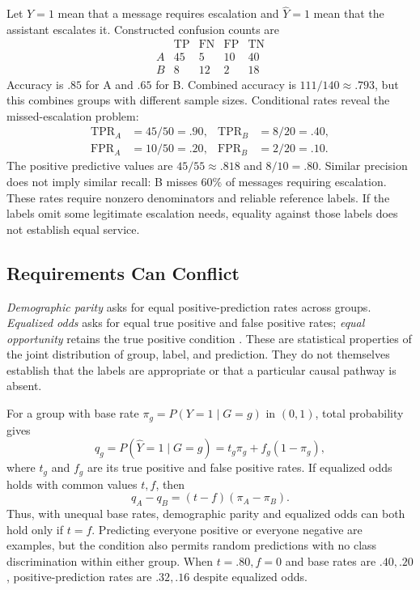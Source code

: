 Let $Y=1$ mean that a message requires escalation and $\hat Y=1$ mean that the assistant escalates it. Constructed confusion counts are
\[
\begin{array}{c|rrrr}
 &\mathrm{TP}&\mathrm{FN}&\mathrm{FP}&\mathrm{TN}\\\hline
A&45&5&10&40\\
B&8&12&2&18
\end{array}
\]
Accuracy is $.85$ for A and $.65$ for B. Combined accuracy is $111/140\approx.793$, but this combines groups with different sample sizes. Conditional rates reveal the missed-escalation problem:
\[
\begin{aligned}
\mathrm{TPR}_A&=45/50=.90,&\mathrm{TPR}_B&=8/20=.40,\\
\mathrm{FPR}_A&=10/50=.20,&\mathrm{FPR}_B&=2/20=.10.
\end{aligned}
\]
The positive predictive values are $45/55\approx.818$ and $8/10=.80$. Similar precision does not imply similar recall: B misses $60\%$ of messages requiring escalation. These rates require nonzero denominators and reliable reference labels. If the labels omit some legitimate escalation needs, equality against those labels does not establish equal service.

\subsection{Requirements Can Conflict}

\emph{Demographic parity} asks for equal positive-prediction rates across groups. \emph{Equalized odds} asks for equal true positive and false positive rates; \emph{equal opportunity} retains the true positive condition \citep{hardt2016}. These are statistical properties of the joint distribution of group, label, and prediction. They do not themselves establish that the labels are appropriate or that a particular causal pathway is absent.

For a group with base rate $\pi_g=P(Y=1\mid G=g)$ in $(0,1)$, total probability gives
\[
q_g=P(\hat Y=1\mid G=g)
=t_g\pi_g+f_g(1-\pi_g),
\]
where $t_g$ and $f_g$ are its true positive and false positive rates. If equalized odds holds with common values $t,f$, then
\[
q_A-q_B=(t-f)(\pi_A-\pi_B).
\]
Thus, with unequal base rates, demographic parity and equalized odds can both hold only if $t=f$. Predicting everyone positive or everyone negative are examples, but the condition also permits random predictions with no class discrimination within either group. When $t=.80,f=0$ and base rates are $.40,.20$, positive-prediction rates are $.32,.16$ despite equalized odds.

